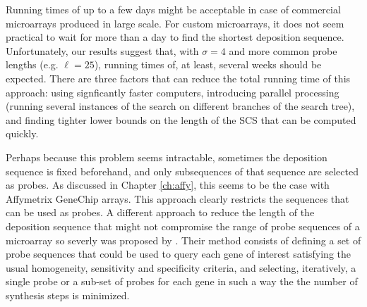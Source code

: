 Running times of up to a few days might be acceptable in case of commercial
microarrays produced in large scale. For custom microarrays, it does not seem
practical to wait for more than a day to find the shortest deposition sequence.
Unfortunately, our results suggest that, with $\sigma = 4$ and more common probe
lengths (e.g. $\ell = 25$), running times of, at least, several weeks should be
expected. There are three factors that can reduce the total running time of this
approach: using signficantly faster computers, introducing parallel processing
(running several instances of the search on different branches of the search
tree), and finding tighter lower bounds on the length of the SCS that can be
computed quickly.

Perhaps because this problem seems intractable, sometimes the deposition
sequence is fixed beforehand, and only subsequences of that sequence are
selected as probes. As discussed in Chapter \ref{ch:affy}, this seems to be the
case with Affymetrix GeneChip arrays. This approach clearly restricts the
sequences that can be used as probes. A different approach to reduce the length
of the deposition sequence that might not compromise the range of probe
sequences of a microarray so severly was proposed by \citet{Tolonen2002}. Their
method consists of defining a set of probe sequences that could be used to query
each gene of interest satisfying the usual homogeneity, sensitivity and
specificity criteria, and selecting, iteratively, a single probe or a sub-set of
probes for each gene in such a way the the number of synthesis steps is
minimized.
